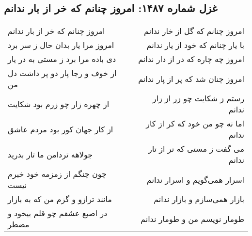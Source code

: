 \begin{center}
\section*{غزل شماره ۱۴۸۷: امروز چنانم که خر از بار ندانم}
\label{sec:1487}
\begin{longtable}{l p{0.5cm} r}
امروز چنانم که خر از بار ندانم
&&
امروز چنانم که گل از خار ندانم
\\
امروز مرا یار بدان حال ز سر برد
&&
با یار چنانم که خود از یار ندانم
\\
دی باده مرا برد ز مستی به در یار
&&
امروز چه چاره که در از دار ندانم
\\
از خوف و رجا پار دو پر داشت دل من
&&
امروز چنان شد که پر از پار ندانم
\\
از چهره زار چو زرم بود شکایت
&&
رستم ز شکایت چو زر از زار ندانم
\\
از کار جهان کور بود مردم عاشق
&&
اما نه چو من خود که کر از کار ندانم
\\
جولاهه تردامن ما تار بدرید
&&
می گفت ز مستی که تر از تار ندانم
\\
چون چنگم از زمزمه خود خبرم نیست
&&
اسرار همی‌گویم و اسرار ندانم
\\
مانند ترازو و گزم من که به بازار
&&
بازار همی‌سازم و بازار ندانم
\\
در اصبع عشقم چو قلم بیخود و مضطر
&&
طومار نویسم من و طومار ندانم
\\
\end{longtable}
\end{center}
